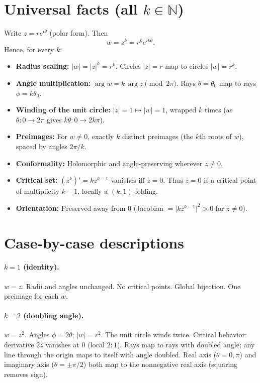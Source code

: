 \documentclass[11pt]{article}
\begin{document}
\section*{Universal facts (all $k\in\mathbb N$)}
Write $z=re^{i\theta}$ (polar form). Then
\[
w=z^{k}=r^{k}e^{ik\theta}.
\]
Hence, for every $k$:
\begin{itemize}
	\item \textbf{Radius scaling:} $\lvert w\rvert=\lvert z\rvert^{k}=r^{k}$. Circles $\lvert z\rvert=r$ map to circles $\lvert w\rvert=r^{k}$.
	\item \textbf{Angle multiplication:} $\arg w=k\,\arg z \pmod{2\pi}$. Rays $\theta=\theta_{0}$ map to rays $\phi=k\theta_{0}$.
	\item \textbf{Winding of the unit circle:} $\lvert z\rvert=1 \mapsto \lvert w\rvert=1$, wrapped $k$ times (as $\theta:0\to 2\pi$ gives $k\theta:0\to 2k\pi$).
	\item \textbf{Preimages:} For $w\neq 0$, exactly $k$ distinct preimages (the $k$th roots of $w$), spaced by angles $2\pi/k$.
	\item \textbf{Conformality:} Holomorphic and angle-preserving wherever $z\neq 0$.
	\item \textbf{Critical set:} $(z^{k})'=k z^{k-1}$ vanishes iff $z=0$. Thus $z=0$ is a critical point of multiplicity $k-1$, locally a $(k:1)$ folding.
	\item \textbf{Orientation:} Preserved away from $0$ (Jacobian $=\lvert k z^{k-1}\rvert^{2}>0$ for $z\neq 0$).
\end{itemize}

\section*{Case-by-case descriptions}
\paragraph{$k=1$ (identity).}
$w=z$. Radii and angles unchanged. No critical points. Global bijection. One preimage for each $w$.

\paragraph{$k=2$ (doubling angle).}
$w=z^{2}$. Angles \(\phi=2\theta\); $\lvert w\rvert=r^{2}$.
The unit circle winds twice. Critical behavior: derivative $2z$ vanishes at $0$ (local $2{:}1$).
Rays map to rays with doubled angle; any line through the origin maps to itself with angle doubled.
Real axis ($\theta=0,\pi$) and imaginary axis ($\theta=\pm\pi/2$) both map to the nonnegative real axis
(squaring removes sign).
\end{document}
